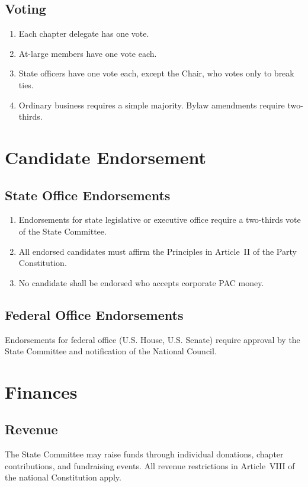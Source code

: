\documentclass[11pt, letterpaper]{article}
\begin{document}
\subsection{Voting}
\begin{enumerate}
  \item Each chapter delegate has one vote.
  \item At-large members have one vote each.
  \item State officers have one vote each, except the Chair, who votes only to break ties.
  \item Ordinary business requires a simple majority. Bylaw amendments require two-thirds.
\end{enumerate}

\section{Candidate Endorsement}

\subsection{State Office Endorsements}
\begin{enumerate}
  \item Endorsements for state legislative or executive office require a two-thirds vote of the State Committee.
  \item All endorsed candidates must affirm the Principles in Article~II of the Party Constitution.
  \item No candidate shall be endorsed who accepts corporate PAC money.
\end{enumerate}

\subsection{Federal Office Endorsements}
Endorsements for federal office (U.S. House, U.S. Senate) require approval by the State Committee and notification of the National Council.

\section{Finances}

\subsection{Revenue}
The State Committee may raise funds through individual donations, chapter contributions, and fundraising events. All revenue restrictions in Article~VIII of the national Constitution apply.
\end{document}
